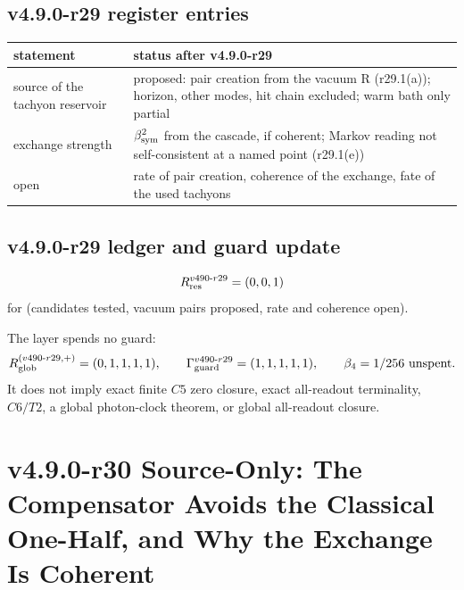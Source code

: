 \subsection*{v4.9.0-r29 register entries}
\label{subsec:v490-r29-register}

\begin{center}
\small
\begin{tabular}{@{}>{\raggedright\arraybackslash}p{}>{\raggedright\arraybackslash}p{}@{}}
\toprule
statement & status after v4.9.0-r29\\
\midrule
source of the tachyon reservoir & proposed: pair creation from the vacuum R (r29.1(a)); horizon, other modes, hit chain excluded; warm bath only partial\\
exchange strength & \(\beta_{\mathrm{sym}}^2\) from the cascade, if coherent; Markov reading not self-consistent at a named point (r29.1(e))\\
open & rate of pair creation, coherence of the exchange, fate of the used tachyons\\
\bottomrule
\end{tabular}
\end{center}

\subsection*{v4.9.0-r29 ledger and guard update}
\label{subsec:v490-r29-ledger-guard}

\[
R_{\rm res}^{v490\text{-}r29}=(0,0,1)
\]
for (candidates tested, vacuum pairs proposed, rate and coherence open).

The layer spends no guard:
\[
R_{\rm glob}^{(v490\text{-}r29,+)}=(0,1,1,1,1),
\qquad
\Gamma_{\rm guard}^{v490\text{-}r29}=(1,1,1,1,1),
\qquad
\beta_4=1/256\ \text{unspent}.
\]
It does not imply exact finite \(C5\) zero closure, exact all-readout terminality,
\(C6/T2\), a global photon-clock theorem, or global all-readout closure.

\clearpage
\section*{v4.9.0-r30 Source-Only: The Compensator Avoids the Classical One-Half, and Why the Exchange Is Coherent}
\label{sec:v490-r30-compensator-coherence}

